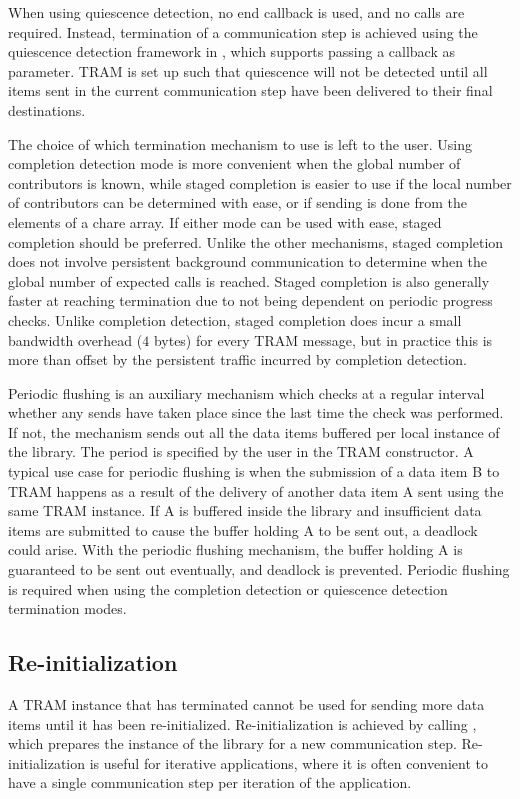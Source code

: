 When using quiescence detection, no end callback is used, and no 
calls are required. Instead, termination of a communication step is achieved
using the quiescence detection framework in \charm{}, which supports passing a
callback as parameter. TRAM is set up such that quiescence will not be detected
until all items sent in the current communication step have been delivered to
their final destinations.

The choice of which termination mechanism to use is left to the user. Using
completion detection mode is more convenient when the global number of
contributors is known, while staged completion is easier to use if the local
number of contributors can be determined with ease, or if sending is done from
the elements of a chare array. If either mode can be used with ease, staged
completion should be preferred. Unlike the other mechanisms, staged completion
does not involve persistent background communication to determine when the
global number of expected  calls is reached. Staged completion is
also generally faster at reaching termination due to not being dependent on
periodic progress checks. Unlike completion detection, staged completion does
incur a small bandwidth overhead ($4$ bytes) for every TRAM message, but in
practice this is more than offset by the persistent traffic incurred by
completion detection.

Periodic flushing is an auxiliary mechanism which checks at a regular interval
whether any sends have taken place since the last time the check was
performed. If not, the mechanism sends out all the data items buffered per local
instance of the library. The period is specified by the user in the TRAM
constructor. A typical use case for periodic flushing is when the submission of
a data item B to TRAM happens as a result of the delivery of another data item A
sent using the same TRAM instance. If A is buffered inside the library and
insufficient data items are submitted to cause the buffer holding A to be sent
out, a deadlock could arise. With the periodic flushing mechanism, the buffer
holding A is guaranteed to be sent out eventually, and deadlock is
prevented. Periodic flushing is required when using the completion detection or
quiescence detection termination modes.

\subsection{Re-initialization}

A TRAM instance that has terminated cannot be used for sending more data items
until it has been re-initialized. Re-initialization is achieved by calling
, which prepares the instance of the library for a new communication
step. Re-initialization is useful for iterative applications, where it is often
convenient to have a single communication step per iteration of the application.

